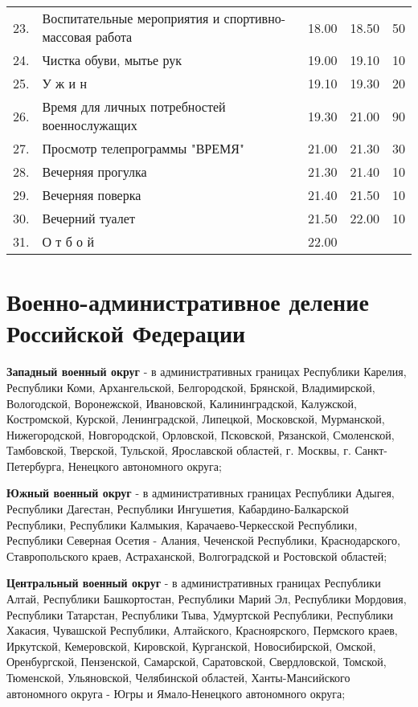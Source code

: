 \documentclass[12pt,a4paper]{report}
\begin{document}
\begin{tabular} {l | l | l | l | l}
	23. & Воспитательные мероприятия и спортивно-массовая работа & 18.00 & 18.50 & 50 \\
	24. & Чистка обуви, мытье рук & 19.00 & 19.10 & 10 \\
	25. & У  ж  и  н & 19.10 & 19.30 & 20 \\
	26. &    Время для личных потребностей военнослужащих & 19.30 & 21.00 & 90 \\
	27. & Просмотр телепрограммы "ВРЕМЯ" & 21.00 & 21.30 & 30 \\
	28. & Вечерняя прогулка & 21.30 & 21.40 & 10 \\
	29. & Вечерняя поверка & 21.40 & 21.50 & 10 \\
	30. & Вечерний туалет & 21.50 & 22.00 & 10 \\
	31. & О  т  б  о  й & 22.00 \\
	\hline
\end{tabular}
\section{Военно-административное деление Российской Федерации}\label{Okruga}
\textbf{Западный военный округ} - в административных границах Республики Карелия, Республики Коми, Архангельской, Белгородской, Брянской, Владимирской, Вологодской, Воронежской, Ивановской, Калининградской, Калужской, Костромской, Курской, Ленинградской, Липецкой, Московской, Мурманской, Нижегородской, Новгородской, Орловской, Псковской, Рязанской, Смоленской, Тамбовской, Тверской, Тульской, Ярославской областей, г. Москвы, г. Санкт-Петербурга, Ненецкого автономного округа;

\textbf{Южный военный округ} - в административных границах Республики Адыгея, Республики Дагестан, Республики Ингушетия, Кабардино-Балкарской Республики, Республики Калмыкия, Карачаево-Черкесской Республики, Республики Северная Осетия - Алания, Чеченской Республики, Краснодарского, Ставропольского краев, Астраханской, Волгоградской и Ростовской областей;

\textbf{Центральный военный округ} - в административных границах Республики Алтай, Республики Башкортостан, Республики Марий Эл, Республики Мордовия, Республики Татарстан, Республики Тыва, Удмуртской Республики, Республики Хакасия, Чувашской Республики, Алтайского, Красноярского, Пермского краев, Иркутской, Кемеровской, Кировской, Курганской, Новосибирской, Омской, Оренбургской, Пензенской, Самарской, Саратовской, Свердловской, Томской, Тюменской, Ульяновской, Челябинской областей, Ханты-Мансийского автономного округа - Югры и Ямало-Ненецкого автономного округа;
\end{document}
